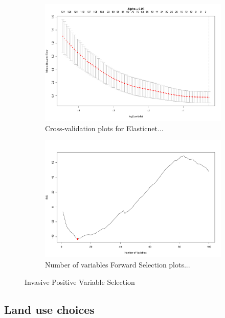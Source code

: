 \documentclass{article}
\begin{document}
\begin{figure}[!tbp]
\begin{subfigure}[b]{0.5\textwidth}
\includegraphics[width=\textwidth]{elastic_cv_invasive_nonzero.pdf}
\caption{Cross-validation plots for Elasticnet...}
\end{subfigure}
\hfill
\begin{subfigure}[b]{0.5\textwidth}
\includegraphics[width=\textwidth]{forward_nvars_invasive_nonzero.pdf}
\caption{Number of variables Forward Selection plots...}
\end{subfigure}
\caption{Invasive Positive Variable Selection}
\label{figure:invasive_nonzero_opt}
\end{figure}


\subsection{Land use choices}
\end{document}
